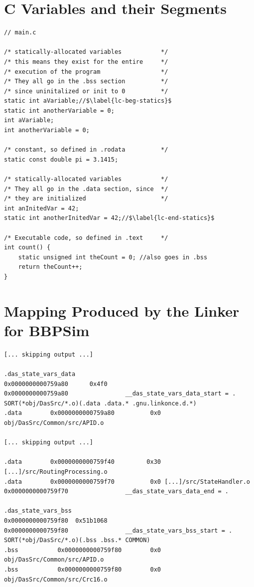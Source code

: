 {
\chapter{C Variables and their Segments}\label{code:c-to-segments}
\begin{verbatim}
// main.c

/* statically-allocated variables       	*/
/* this means they exist for the entire 	*/
/* execution of the program             	*/
/* They all go in the .bss section 			*/
/* since uninitalized or init to 0 			*/
static int aVariable;//$\label{lc-beg-statics}$
static int anotherVariable = 0;
int aVariable;
int anotherVariable = 0;

/* constant, so defined in .rodata		 	*/
static const double pi = 3.1415;

/* statically-allocated variables       	*/
/* They all go in the .data section, since	*/
/* they are initialized						*/
int anInitedVar = 42;
static int anotherInitedVar = 42;//$\label{lc-end-statics}$

/* Executable code, so defined in .text 	*/
int count() {
	static unsigned int theCount = 0; //also goes in .bss 
	return theCount++;
}
\end{verbatim}

\chapter{Mapping Produced by the Linker for BBPSim}\label{map:ld}

{\small
\begin{verbatim}
[... skipping output ...]

.das_state_vars_data
0x0000000000759a80      0x4f0
0x0000000000759a80                __das_state_vars_data_start = .
SORT(*obj/DasSrc/*.o)(.data .data.* .gnu.linkonce.d.*)
.data        0x0000000000759a80          0x0 obj/DasSrc/Common/src/APID.o

[... skipping output ...]

.data        0x0000000000759f40         0x30 [...]/src/RoutingProcessing.o
.data        0x0000000000759f70          0x0 [...]/src/StateHandler.o
0x0000000000759f70                __das_state_vars_data_end = .

.das_state_vars_bss
0x0000000000759f80  0x51b1068
0x0000000000759f80                __das_state_vars_bss_start = .
SORT(*obj/DasSrc/*.o)(.bss .bss.* COMMON)
.bss           0x0000000000759f80        0x0 obj/DasSrc/Common/src/APID.o
.bss           0x0000000000759f80        0x0 obj/DasSrc/Common/src/Crc16.o


\end{verbatim}}}
